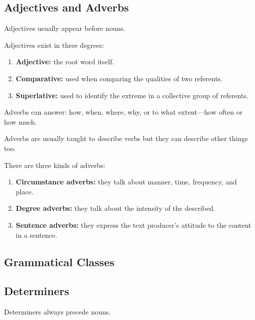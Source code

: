 \documentclass[../main.tex]{subfiles}
\begin{document}
	\subsection{Adjectives and Adverbs}
	Adjectives usually appear before nouns.
	
	Adjectives exist in three degrees:
	\begin{enumerate}
		\item \textbf{Adjective:} the root word itself.
		\item \textbf{Comparative:} used when comparing the qualities of two referents.
		\item \textbf{Superlative:} used to identify the extreme in a collective group of referents.
	\end{enumerate}
	
	Adverbs can answer: how, when, where, why, or to what extent---how often or how much.
	
	Adverbs are usually taught to describe verbs but they can describe other things too.
	
	There are three kinds of adverbs:
	\begin{enumerate}
		\item \textbf{Circumstance adverbs:} they talk about manner, time, frequency, and place.
		\item \textbf{Degree adverbs:} they talk about the intensity of the described.
		\item \textbf{Sentence adverbs:} they express the text producer's attitude to the content in a sentence.
	\end{enumerate}
	
	\subsection*{Grammatical Classes}
	\subsection{Determiners}
	Determiners always precede nouns.
\end{document}
